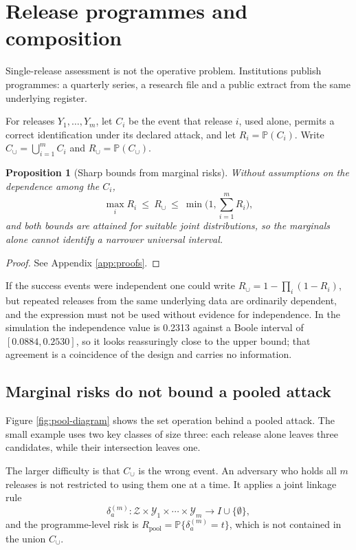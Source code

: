 \documentclass[11pt,a4paper]{article}
\theoremstyle{plain}
\newtheorem{proposition}{Proposition}
\theoremstyle{definition}
\newcommand{\Prob}{\mathbb{P}}
\begin{document}
\section{Release programmes and composition}\label{sec:comp}

Single-release assessment is not the operative problem. Institutions publish
programmes: a quarterly series, a research file and a public extract from the
same underlying register.

For releases $Y_1, \dots, Y_m$, let $C_i$ be the event that release $i$, used
alone, permits a correct identification under its declared attack, and let $R_i
= \Prob(C_i)$. Write $C_\cup = \bigcup_{i=1}^m C_i$ and $R_\cup =
\Prob(C_\cup)$.

\begin{proposition}[Sharp bounds from marginal risks]\label{prop:boole}
Without assumptions on the dependence among the $C_i$,
\begin{equation}
\max_i R_i \ \leq \ R_\cup \ \leq \ \min\Big(1, \sum_{i=1}^m R_i\Big) ,
\label{eq:boole}
\end{equation}
and both bounds are attained for suitable joint distributions, so the marginals
alone cannot identify a narrower universal interval.
\end{proposition}

\begin{proof}
See Appendix \ref{app:proofs}.
\end{proof}

If the success events were independent one could write $R_\cup = 1 -
\prod_{i}(1 - R_i)$, but repeated releases from the same underlying data are
ordinarily dependent, and the expression must not be used without evidence for
independence. In the simulation the independence value is 0.2313 against
a Boole interval of $[0.0884, 0.2530]$, so it looks reassuringly close to the upper
bound; that agreement is a coincidence of the design and carries no
information.

\subsection{Marginal risks do not bound a pooled attack}

Figure \ref{fig:pool-diagram} shows the set operation behind a pooled attack.
The small example uses two key classes of size three: each release alone
leaves three candidates, while their intersection leaves one.


The larger difficulty is that $C_\cup$ is the wrong event. An adversary who holds
all $m$ releases is not restricted to using them one at a time. It applies a
joint linkage rule
\begin{equation}
\delta_a^{(m)} : \mathcal{Z} \times \mathcal{Y}_1 \times \cdots \times
\mathcal{Y}_m \longrightarrow I \cup \{\emptyset\} ,
\label{eq:joint}
\end{equation}
and the programme-level risk is $R_{\mathrm{pool}} = \Prob\{\delta_a^{(m)} =
t\}$, which is not contained in the union $C_\cup$.
\end{document}
